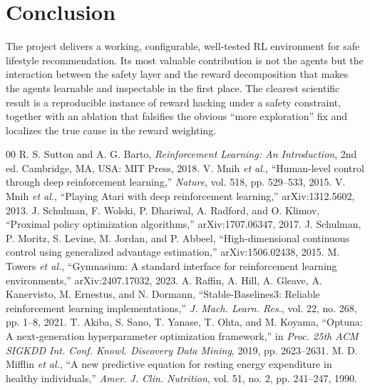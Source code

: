 \documentclass[conference]{IEEEtran}
\begin{document}
\section{Conclusion}
The project delivers a working, configurable, well-tested RL environment for safe
lifestyle recommendation. Its most valuable contribution is not the agents but
the interaction between the safety layer and the reward decomposition that makes
the agents learnable and inspectable in the first place. The clearest scientific
result is a reproducible instance of reward hacking under a safety constraint,
together with an ablation that falsifies the obvious ``more exploration'' fix and
localizes the true cause in the reward weighting.

\begin{thebibliography}{00}
 R. S. Sutton and A. G. Barto, \emph{Reinforcement Learning: An
Introduction}, 2nd ed. Cambridge, MA, USA: MIT Press, 2018.
 V. Mnih \emph{et al.}, ``Human-level control through deep
reinforcement learning,'' \emph{Nature}, vol. 518, pp. 529--533, 2015.
 V. Mnih \emph{et al.}, ``Playing Atari with deep
reinforcement learning,'' arXiv:1312.5602, 2013.
 J. Schulman, F. Wolski, P. Dhariwal, A. Radford, and O. Klimov,
``Proximal policy optimization algorithms,'' arXiv:1707.06347, 2017.
 J. Schulman, P. Moritz, S. Levine, M. Jordan, and P. Abbeel,
``High-dimensional continuous control using generalized advantage estimation,''
arXiv:1506.02438, 2015.
 M. Towers \emph{et al.}, ``Gymnasium: A standard interface
for reinforcement learning environments,'' arXiv:2407.17032, 2023.
 A. Raffin, A. Hill, A. Gleave, A. Kanervisto, M. Ernestus, and
N. Dormann, ``Stable-Baselines3: Reliable reinforcement learning
implementations,'' \emph{J. Mach. Learn. Res.}, vol. 22, no. 268, pp. 1--8, 2021.
 T. Akiba, S. Sano, T. Yanase, T. Ohta, and M. Koyama, ``Optuna:
A next-generation hyperparameter optimization framework,'' in \emph{Proc. 25th
ACM SIGKDD Int. Conf. Knowl. Discovery Data Mining}, 2019, pp. 2623--2631.
 M. D. Mifflin \emph{et al.}, ``A new predictive equation for
resting energy expenditure in healthy individuals,'' \emph{Amer. J. Clin.
Nutrition}, vol. 51, no. 2, pp. 241--247, 1990.
\end{thebibliography}
\end{document}
